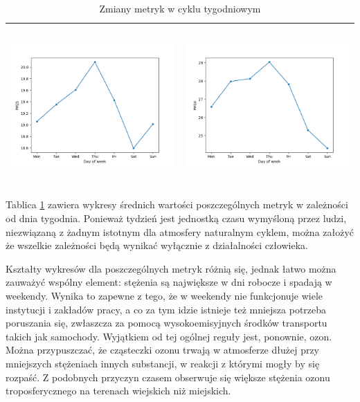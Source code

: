 \documentclass[18pt, letterpaper]{article}
\begin{document}
\begin{table}[H]
\begin{tabular}{|c|c|}
\includegraphics[width=80mm,height=60mm]{visualisations/cycles/weekly_PM25.png}  & \includegraphics[width=80mm,height=60mm]{visualisations/cycles/weekly_PM10.png} \\ \hline
\end{tabular}
\caption{Zmiany metryk w cyklu tygodniowym}
\label{table:weekly}
\end{table}

Tablica \ref{table:weekly} zawiera wykresy średnich wartości poszczególnych metryk w zależności od dnia tygodnia. Ponieważ tydzień jest jednostką czasu wymyśloną przez ludzi, niezwiązaną z żadnym istotnym dla atmosfery naturalnym cyklem, można założyć że wszelkie zależności będą wynikać wyłącznie z działalności człowieka.

Kształty wykresów dla poszczególnych metryk różnią się, jednak łatwo można zauważyć wspólny element: stężenia są największe w dni robocze i spadają w weekendy. Wynika to zapewne z tego, że w weekendy nie funkcjonuje wiele instytucji i zakładów pracy, a co za tym idzie istnieje też mniejsza potrzeba poruszania się, zwłaszcza za pomocą wysokoemisyjnych środków transportu takich jak samochody. Wyjątkiem od tej ogólnej reguły jest, ponownie, ozon. Można przypuszczać, że cząsteczki ozonu trwają w atmosferze dłużej przy mniejszych stężeniach innych substancji, w reakcji z którymi mogły by się rozpaść. Z podobnych przyczyn czasem obserwuje się większe stężenia ozonu troposferycznego na terenach wiejskich niż miejskich. \cite{ozone_rural}
\end{document}
